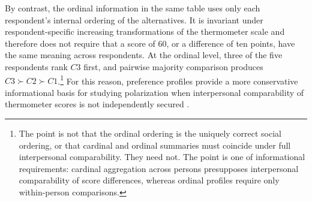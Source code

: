 \documentclass[12pt]{article}
\begin{document}
By contrast, the ordinal information in the same table uses only each
respondent's internal ordering of the alternatives. It is invariant under
respondent-specific increasing transformations of the thermometer scale and
therefore does not require that a score of \(60\), or a difference of ten
points, have the same meaning across respondents. At the ordinal level,
three of the five respondents rank \(C3\) first, and pairwise majority
comparison produces \(C3 \succ C2 \succ C1\).\footnote{The point is not that
the ordinal ordering is the uniquely correct social ordering, or that
cardinal and ordinal summaries must coincide under full interpersonal
comparability. They need not. The point is one of informational
requirements: cardinal aggregation across persons presupposes interpersonal
comparability of score differences, whereas ordinal profiles require only
within-person comparisons.} For this reason, preference profiles provide a
more conservative informational basis for studying polarization when
interpersonal comparability of thermometer scores is not independently
secured \parencite{narens2007introduction}.
\end{document}
